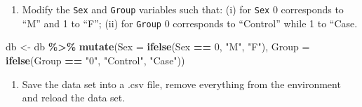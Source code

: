 \documentclass[
]{article}
\newenvironment{Shaded}{\begin{snugshade}}{\end{snugshade}}
\newcommand{\AttributeTok}[1]{\textcolor[rgb]{0.13,0.29,0.53}{#1}}
\newcommand{\ConstantTok}[1]{\textcolor[rgb]{0.56,0.35,0.01}{#1}}
\newcommand{\ControlFlowTok}[1]{\textcolor[rgb]{0.13,0.29,0.53}{\textbf{#1}}}
\newcommand{\DecValTok}[1]{\textcolor[rgb]{0.00,0.00,0.81}{#1}}
\newcommand{\FunctionTok}[1]{\textcolor[rgb]{0.13,0.29,0.53}{\textbf{#1}}}
\newcommand{\NormalTok}[1]{#1}
\newcommand{\OtherTok}[1]{\textcolor[rgb]{0.56,0.35,0.01}{#1}}
\newcommand{\SpecialCharTok}[1]{\textcolor[rgb]{0.81,0.36,0.00}{\textbf{#1}}}
\newcommand{\StringTok}[1]{\textcolor[rgb]{0.31,0.60,0.02}{#1}}
\providecommand{\tightlist}{%
  \setlength{\itemsep}{0pt}\setlength{\parskip}{0pt}}
\begin{document}
\begin{Shaded}
\end{Shaded}

\begin{enumerate}
\def\labelenumi{\alph{enumi}.}
\tightlist
\item
  Modify the \texttt{Sex} and \texttt{Group} variables such that: (i)
  for \texttt{Sex} 0 corresponds to ``M'' and 1 to ``F''; (ii) for
  \texttt{Group} 0 corresponds to ``Control'' while 1 to ``Case.
\end{enumerate}

\begin{Shaded}
\begin{Highlighting}[]
\NormalTok{db }\OtherTok{\textless{}{-}}\NormalTok{ db }\SpecialCharTok{\%\textgreater{}\%}
  \FunctionTok{mutate}\NormalTok{(}\AttributeTok{Sex =} \FunctionTok{ifelse}\NormalTok{(Sex }\SpecialCharTok{==} \DecValTok{0}\NormalTok{, }\StringTok{"M"}\NormalTok{, }\StringTok{"F"}\NormalTok{),}
         \AttributeTok{Group =} \FunctionTok{ifelse}\NormalTok{(Group }\SpecialCharTok{==} \StringTok{"0"}\NormalTok{, }\StringTok{"Control"}\NormalTok{, }\StringTok{"Case"}\NormalTok{))}
\end{Highlighting}
\end{Shaded}

\begin{enumerate}
\def\labelenumi{\alph{enumi}.}
\setcounter{enumi}{1}
\tightlist
\item
  Save the data set into a .csv file, remove everything from the
  environment and reload the data set.
\end{enumerate}
\end{document}
